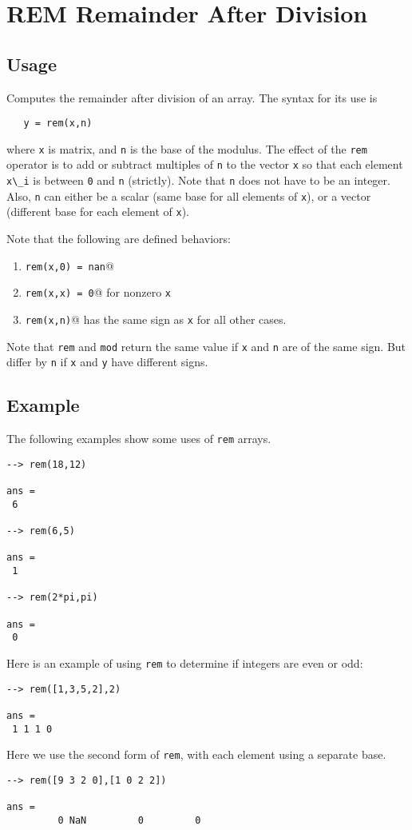 \section{REM Remainder After Division}

\subsection{Usage}

Computes the remainder after division of an array.  The syntax for its use is
\begin{verbatim}
   y = rem(x,n)
\end{verbatim}
where \verb|x| is matrix, and \verb|n| is the base of the modulus.  The
effect of the \verb|rem| operator is to add or subtract multiples of \verb|n|
to the vector \verb|x| so that each element \verb|x\_i| is between \verb|0| and \verb|n|
(strictly).  Note that \verb|n| does not have to be an integer.  Also,
\verb|n| can either be a scalar (same base for all elements of \verb|x|), or a
vector (different base for each element of \verb|x|).

Note that the following are defined behaviors:
\begin{enumerate}
\item \verb|rem(x,0) = nan|@
\item \verb|rem(x,x) = 0|@ for nonzero \verb|x|
\item \verb|rem(x,n)|@ has the same sign as \verb|x| for all other cases.
\end{enumerate}
Note that \verb|rem| and \verb|mod| return the same value if \verb|x| and \verb|n|
are of the same sign.  But differ by \verb|n| if \verb|x| and \verb|y| have 
different signs.
\subsection{Example}

The following examples show some uses of \verb|rem|
arrays.
\begin{verbatim}
--> rem(18,12)

ans = 
 6 

--> rem(6,5)

ans = 
 1 

--> rem(2*pi,pi)

ans = 
 0 
\end{verbatim}
Here is an example of using \verb|rem| to determine if integers are even
 or odd:
\begin{verbatim}
--> rem([1,3,5,2],2)

ans = 
 1 1 1 0 
\end{verbatim}
Here we use the second form of \verb|rem|, with each element using a 
separate base.
\begin{verbatim}
--> rem([9 3 2 0],[1 0 2 2])

ans = 
         0 NaN         0         0 
\end{verbatim}
